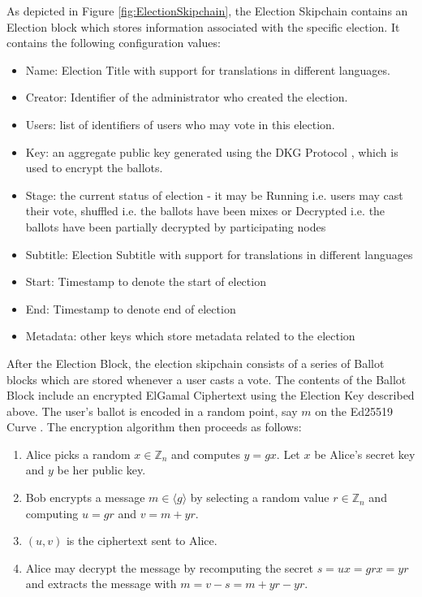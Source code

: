 As depicted in Figure \ref{fig:ElectionSkipchain}, the Election Skipchain contains an Election block which stores information associated with the specific election. It contains the following configuration values:

\begin{itemize}
\item Name: Election Title with support for translations in different languages.
\item Creator: Identifier of the administrator who created the election.
\item Users: list of identifiers of users who may vote in this election.
\item Key: an aggregate public key generated using the DKG Protocol \cite{dkg}, which is used to encrypt the ballots.
\item Stage: the current status of election - it may be Running i.e. users may cast their vote, shuffled i.e. the ballots have been mixes or Decrypted i.e. the ballots have been partially decrypted by participating nodes
\item Subtitle: Election Subtitle with support for translations in different languages
\item Start: Timestamp to denote the start of election
\item End: Timestamp to denote end of election
\item Metadata: other keys which store metadata related to the election
\end{itemize}

After the Election Block, the election skipchain consists of a series of Ballot blocks which are stored whenever a user casts a vote. The contents of the Ballot Block include an encrypted ElGamal Ciphertext using the Election Key described above. The user's ballot is encoded in a random point, say $m$ on the Ed25519 Curve \cite{ed25519}. The encryption algorithm then proceeds as follows:

\begin{enumerate}
  \item Alice picks a random \( x \in \mathbb{Z}_{n} \) and computes \( y = gx \). Let $x$ be Alice's secret key and $y$ be her public key.
  \item Bob encrypts a message \( m \in \langle g \rangle \) by selecting a random value \( r \in \mathbb{Z}_{n} \) and computing \( u = gr \) and \( v= m + yr \).
  \item \( (u, v) \) is the ciphertext sent to Alice.
  \item Alice may decrypt the message by recomputing the secret \( s = ux = grx = yr \) and extracts the message with \( m = v - s = m + yr - yr \).
\end{enumerate}

